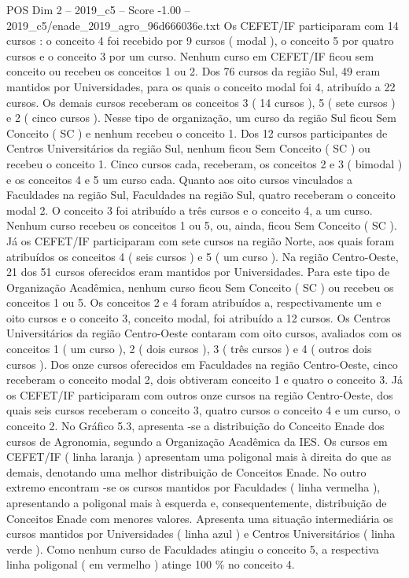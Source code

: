 \begin{textsample}{POS Dim 2 – 2019\_c5 – Score -1.00 – 2019\_c5/enade\_2019\_agro\_96d666036e.txt}
Os CEFET/IF participaram com 14 cursos : o conceito 4 foi recebido por 9 cursos ( modal ), o conceito 5 por quatro cursos e o conceito 3 por um curso.
Nenhum curso em CEFET/IF ficou sem conceito ou recebeu os conceitos 1 ou 2.
Dos 76 cursos da região Sul, 49 eram mantidos por Universidades, para os quais o conceito modal foi 4, atribuído a 22 cursos.
Os demais cursos receberam os conceitos 3 ( 14 cursos ), 5 ( sete cursos ) e 2 ( cinco cursos ).
Nesse tipo de organização, um curso da região Sul ficou Sem Conceito ( SC ) e nenhum recebeu o conceito 1.
Dos 12 cursos participantes de Centros Universitários da região Sul, nenhum ficou Sem Conceito ( SC ) ou recebeu o conceito 1.
Cinco cursos cada, receberam, os conceitos 2 e 3 ( bimodal ) e os conceitos 4 e 5 um curso cada.
Quanto aos oito cursos vinculados a Faculdades na região Sul, Faculdades na região Sul, quatro receberam o conceito modal 2.
O conceito 3 foi atribuído a três cursos e o conceito 4, a um curso.
Nenhum curso recebeu os conceitos 1 ou 5, ou, ainda, ficou Sem Conceito ( SC ).
Já os CEFET/IF participaram com sete cursos na região Norte, aos quais foram atribuídos os conceitos 4 ( seis cursos ) e 5 ( um curso ).
Na região Centro-Oeste, 21 dos 51 cursos oferecidos eram mantidos por Universidades.
Para este tipo de Organização Acadêmica, nenhum curso ficou Sem Conceito ( SC ) ou recebeu os conceitos 1 ou 5.
Os conceitos 2 e 4 foram atribuídos a, respectivamente um e oito cursos e o conceito 3, conceito modal, foi atribuído a 12 cursos.
Os Centros Universitários da região Centro-Oeste contaram com oito cursos, avaliados com os conceitos 1 ( um curso ), 2 ( dois cursos ), 3 ( três cursos ) e 4 ( outros dois cursos ).
Dos onze cursos oferecidos em Faculdades na região Centro-Oeste, cinco receberam o conceito modal 2, dois obtiveram conceito 1 e quatro o conceito 3.
Já os CEFET/IF participaram com outros onze cursos na região Centro-Oeste, dos quais seis cursos receberam o conceito 3, quatro cursos o conceito 4 e um curso, o conceito 2.
No Gráfico 5.3, apresenta -se a distribuição do Conceito Enade dos cursos de Agronomia, segundo a Organização Acadêmica da IES.
Os cursos em CEFET/IF ( linha laranja ) apresentam uma poligonal mais à direita do que as demais, denotando uma melhor distribuição de Conceitos Enade.
No outro extremo encontram -se os cursos mantidos por Faculdades ( linha vermelha ), apresentando a poligonal mais à esquerda e, consequentemente, distribuição de Conceitos Enade com menores valores.
Apresenta uma situação intermediária os cursos mantidos por Universidades ( linha azul ) e Centros Universitários ( linha verde ).
Como nenhum curso de Faculdades atingiu o conceito 5, a respectiva linha poligonal ( em vermelho ) atinge 100 \% no conceito 4.

\end{textsample}

